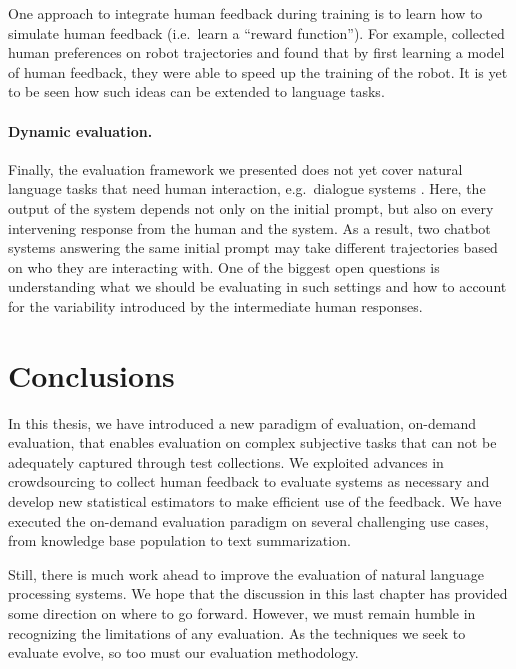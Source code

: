 One approach to integrate human feedback during training is to learn how to simulate human feedback (i.e.\ learn a ``reward function'').
For example, \citet{christiano2017deep} collected human preferences on robot trajectories and found that by first learning a model of human feedback, they were able to speed up the training of the robot.
It is yet to be seen how such ideas can be extended to language tasks.

\paragraph{Dynamic evaluation.}
Finally, the evaluation framework we presented does not yet cover natural language tasks that need human interaction, e.g.\ dialogue systems .
Here, the output of the system depends not only on the initial prompt, but also on every intervening response from the human and the system.
As a result, two chatbot systems answering the same initial prompt may take different trajectories based on who they are interacting with.
One of the biggest open questions is understanding what we should be evaluating in such settings and how to account for the variability introduced by the intermediate human responses.

\section{Conclusions}
In this thesis, we have introduced a new paradigm of evaluation, on-demand evaluation, that enables evaluation on complex subjective  tasks that can not be adequately captured through test collections.
We exploited advances in crowdsourcing to collect human feedback to evaluate systems as necessary and develop new statistical estimators to make efficient use of the feedback.
We have executed the on-demand evaluation paradigm on several challenging use cases, from knowledge base population to text summarization.

Still, there is much work ahead to improve the evaluation of natural language processing systems.
We hope that the discussion in this last chapter has provided some direction on where to go forward.
However, we must remain humble in recognizing the limitations of any evaluation.
As the techniques we seek to evaluate evolve, so too must our evaluation methodology.

